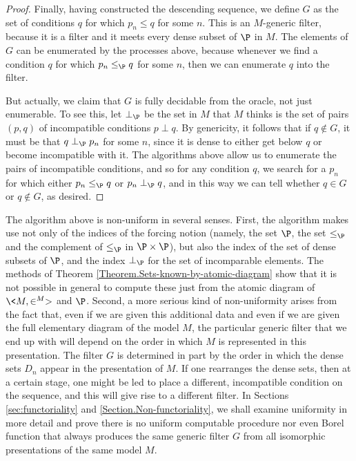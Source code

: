 \documentclass{amsart}
\begin{document}
\begin{proof}
Finally, having constructed the descending sequence, we define $G$ as the set of conditions $q$ for which $p_n\leq q$ for some $n$. This is an $M$-generic filter, because it is a filter and it meets every dense subset of $\P$ in $M$. The elements of $G$ can be enumerated by the processes above, because whenever we find a condition $q$ for which $p_n\leq_\P q$ for some $n$, then we can enumerate $q$ into the filter.

But actually, we claim that $G$ is fully decidable from the oracle, not just enumerable. To see this, let $\perp_\P$ be the set in $M$ that $M$ thinks is the set of pairs $(p,q)$ of incompatible conditions $p\perp q$. By genericity, it follows that if $q\notin G$, it must be that $q\perp_\P p_n$ for some $n$, since it is dense to either get below $q$ or become incompatible with it. The algorithms above allow us to enumerate the pairs of incompatible conditions, and so for any condition $q$, we search for a $p_n$ for which either $p_n\leq_\P q$ or $p_n\perp_\P q$, and in this way we can tell whether $q\in G$ or $q\notin G$, as desired.
\end{proof}

The algorithm above is non-uniform in several senses. First, the algorithm makes use not only of the indices
of the forcing notion (namely, the set $\P$, the set $\leq_{\P}$ and the complement of $\leq_{\P}$ in $\P\times\P$),
but also the index of the set of dense subsets of $\P$, and the index $\perp_\P$ for the set of incomparable elements. The methods of Theorem \ref{Theorem.Sets-known-by-atomic-diagram} show that it is not possible in general to compute these just from the atomic diagram of $\<M,\in^M>$ and $\P$. Second, a more serious kind of non-uniformity arises from the fact that, even if we are given this additional data and even if we are given the full elementary diagram of the model $M$, the particular generic filter that we end up with will depend on the order in which $M$ is represented in this presentation. The filter $G$ is determined in part by the order in which the dense sets $D_n$ appear in the presentation of $M$. If one rearranges the dense sets, then at a certain stage, one might be led to place a different, incompatible condition on the sequence, and this will give rise to a different filter.
In Sections \ref{sec:functoriality} and \ref{Section.Non-functoriality}, we shall examine uniformity in more detail and prove there is no uniform computable procedure nor even Borel function that always
produces the same generic filter $G$ from all isomorphic presentations of the same model $M$.
\end{document}
